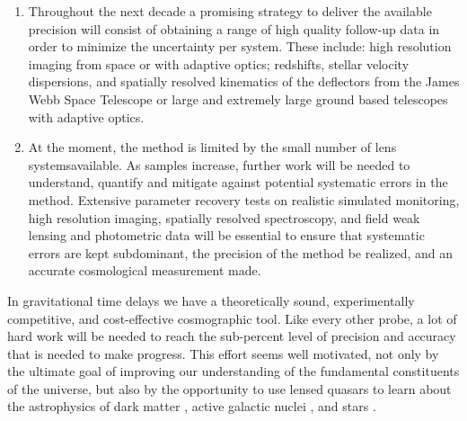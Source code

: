 \begin{enumerate}
%
\item Throughout the next decade a promising strategy to deliver the
available precision will consist of obtaining a range of high quality
follow-up data in order to minimize the uncertainty per system. These
include: high resolution imaging from space or with adaptive optics;
redshifts, stellar velocity dispersions, and spatially resolved
kinematics of the deflectors from the James Webb Space Telescope or
large and extremely large ground based telescopes with adaptive
optics.
%
%
\item  At the moment, the method is limited by the small number of lens
systemsavailable. As samples increase, further work will be needed to
understand, quantify and mitigate against potential systematic errors
in the method. Extensive parameter recovery tests on realistic
simulated monitoring, high resolution imaging, spatially resolved
spectroscopy, and field weak lensing and photometric data will be
essential to ensure that systematic errors are kept subdominant, the
precision of the method be realized, and an accurate cosmological
measurement made.
\end{enumerate}


In gravitational time delays we have a theoretically sound,
experimentally competitive, and cost-effective cosmographic tool.
Like every other probe, a lot of hard work will be needed to reach the
sub-percent level of precision and accuracy that is needed to make
progress. This effort seems well motivated, not only by the ultimate
goal of improving our understanding of the fundamental constituents of
the universe, but also by the opportunity to use lensed quasars to
learn about the astrophysics of dark matter
\citep{Metcalf:2005p1203,Xu++09,Veg++14,Nie++14}, active galactic
nuclei \citep{PMK08,Blackburne:2010p6600}, and stars
\citep{Sch++14}.

